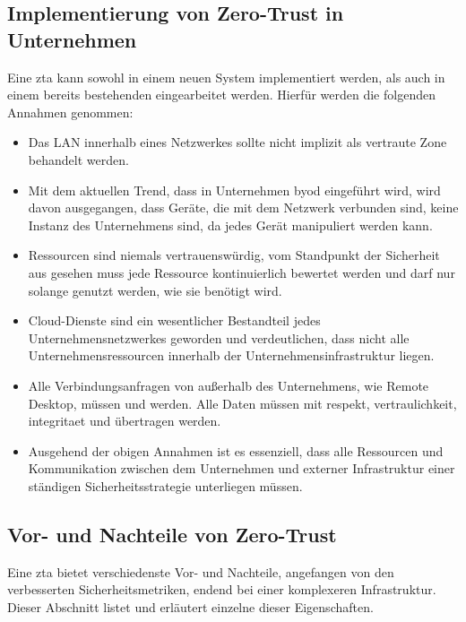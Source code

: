 \subsection{Implementierung von Zero-Trust in Unternehmen}\label{subsec:implementierung-von-zero-trust-in-unternehmen}
Eine \ac{zta} kann sowohl in einem neuen System implementiert werden, als auch in einem bereits bestehenden eingearbeitet werden.
Hierfür werden die folgenden Annahmen genommen:\autocite[\vglf][]{dsilvia-2021}
\begin{itemize}
    \item Das LAN innerhalb eines Netzwerkes sollte nicht implizit als vertraute Zone behandelt werden.
    \item Mit dem aktuellen Trend, dass in Unternehmen \ac{byod} eingeführt wird, wird davon ausgegangen, dass Geräte, die mit dem Netzwerk verbunden sind, keine Instanz des Unternehmens sind, da jedes Gerät manipuliert werden kann.
    \item Ressourcen sind niemals vertrauenswürdig, \dah vom Standpunkt der Sicherheit aus gesehen muss jede Ressource kontinuierlich bewertet werden und darf nur solange genutzt werden, wie sie benötigt wird.
    \item Cloud-Dienste sind ein wesentlicher Bestandteil jedes Unternehmensnetzwerkes geworden und verdeutlichen, dass nicht alle Unternehmensressourcen innerhalb der Unternehmensinfrastruktur liegen.
    \item Alle Verbindungsanfragen von außerhalb des Unternehmens, wie \zb Remote Desktop, müssen  und  werden.
    Alle Daten müssen mit \gls{respekt}, \gls{vertraulichkeit}, \gls{integritaet} und  übertragen werden.
    \item Ausgehend der obigen Annahmen ist es essenziell, dass alle Ressourcen und Kommunikation zwischen dem Unternehmen und externer Infrastruktur einer ständigen Sicherheitsstrategie unterliegen müssen.
\end{itemize}

\subsection{Vor- und Nachteile von Zero-Trust}\label{subsec:vor-und-nachteile-von-zero-trust}
Eine \ac{zta} bietet verschiedenste Vor- und Nachteile, angefangen von den verbesserten Sicherheitsmetriken, endend bei einer komplexeren Infrastruktur.
Dieser Abschnitt listet und erläutert einzelne dieser Eigenschaften.

